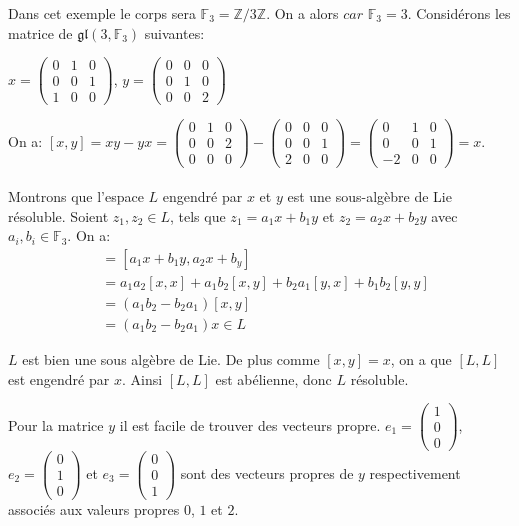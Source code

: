 \documentclass[a4paper,openany,12pt]{report}
\newcommand{\ZZ}{\mathbb{Z}}
\newcommand{\FF}{\mathbb{F}}
\newcommand{\gl}{\mathfrak{gl}}
\theoremstyle{break}
{\theorembodyfont{\upshape}
\newtheorem*{rmq}{Remarque :}
\newtheorem*{prv}{Preuve :}
\newtheorem*{ex}{Exemples :}
\newtheorem*{exe}{Exemple : }
\newtheorem*{nota}{Notation :}
\newtheorem*{dem}{D\'emonstration :}}
\begin{document}
\begin{exe}
\quad Dans cet exemple le corps sera $\FF_3 = \ZZ /3 \ZZ$. On a alors $car$ $\FF_3 = 3$. Considérons les matrice de $\gl(3,\FF_3)$ suivantes: 
\begin{center}
$x = \begin{pmatrix}
0 & 1 & 0 \\
0 & 0 & 1 \\
1 & 0 & 0 
\end{pmatrix}$, \quad
$y = \begin{pmatrix}
0 & 0 & 0 \\
0 & 1 & 0 \\
0 & 0 & 2 
\end{pmatrix}$
\end{center}
On a: $[x,y] = xy - yx = 
\begin{pmatrix} 
0 & 1 & 0 \\
0 & 0 & 2 \\
0 & 0 & 0 
\end{pmatrix}-\begin{pmatrix}
0 & 0 & 0 \\
0 & 0 & 1 \\
2 & 0 & 0 
\end{pmatrix} = \begin{pmatrix}
0 & 1 & 0 \\
0 & 0 & 1 \\
-2 & 0 & 0 
\end{pmatrix} = x $.\\
\\
Montrons que l'espace $L$ engendré par $x$ et $y$ est une sous-algèbre de Lie résoluble. Soient $z_1,z_2 \in L$, tels que $z_1 = a_1x+b_1y$ et $z_2=a_2x+b_2y$ avec $a_i,b_i \in \FF_3$. On a:
\begin{align*}
[z_1,z_2] &= [a_1x+b_1y,a_2x+b_y]\\
& = a_1a_2[x,x]+a_1b_2[x,y]+b_2a_1[y,x]+b_1b_2[y,y]\\
& = (a_1b_2-b_2a_1)[x,y]\\
& = (a_1b_2-b_2a_1)x \in L
\end{align*}

$L$ est bien une sous algèbre de Lie. De plus comme $[x,y]=x$, on a que $[L,L]$ est engendré par $x$. Ainsi $[L,L]$ est abélienne, donc $L$ résoluble. 

Pour la matrice $y$ il est facile de trouver des vecteurs propre. $e_1 = \begin{pmatrix}1 \\ 0 \\ 0\end{pmatrix}$, $e_2 = \begin{pmatrix}0 \\ 1 \\ 0 \end{pmatrix}$ et $e_3 = \begin{pmatrix}0 \\ 0 \\ 1\end{pmatrix}$ sont des vecteurs propres de $y$ respectivement associés aux valeurs propres $0$, $1$ et $2$.


\end{exe}
\end{document}
